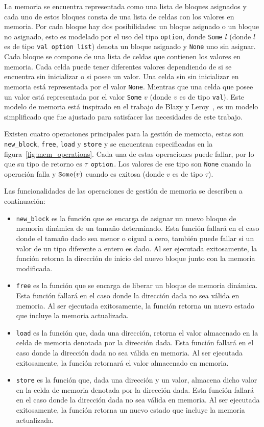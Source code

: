 La memoria se encuentra representada como una lista de bloques asignados y cada uno de estos bloques consta de una lista de celdas con los valores en memoria.
Por cada bloque hay dos posibilidades: un bloque asignado o un bloque no asignado, esto es modelado por el uso del tipo \verb|option|, donde \verb|Some| $l$ (donde $l$ es de tipo \verb|val option list|) denota un bloque asignado y \verb|None| uno sin asignar.
Cada bloque se compone de una lista de celdas que contienen los valores en memoria.
Cada celda puede tener diferentes valores dependiendo de si se encuentra sin inicializar o si posee un valor.
Una celda sin sin inicializar en memoria está representada por el valor \verb|None|.
Mientras que una celda que posee un valor está representada por el valor \verb|Some| $v$ (donde $v$ es de tipo \verb|val|).
Este modelo de memoria está inspirado en el trabajo de Blazy y Leroy~\cite{leroy-blazy-memory-model}, es un modelo simplificado que fue ajustado para satisfacer las necesidades de este trabajo.

Existen cuatro operaciones principales para la gestión de memoria, estas son \verb|new_block|, \verb|free|, \verb|load| y \verb|store| y se encuentran especificadas en la figura~\ref{fig:mem_operations}.
Cada una de estas operaciones puede fallar, por lo que su tipo de retorno es $\tau\ \verb|option|$.
Los valores de ese tipo son \verb|None| cuando la operación falla y $\verb|Some|(v)$ cuando es exitosa (donde $v$ es de tipo $\tau$).

Las funcionalidades de las operaciones de gestión de memoria se describen a continuación:

\begin{itemize}
  \item{\verb|new_block| es la función que se encarga de asignar un nuevo bloque de memoria dinámica de un tamaño determinado.
    Esta función fallará en el caso donde el tamaño dado sea menor o oigual a cero, también puede fallar si un valor de un tipo diferente a entero es dado.
    Al ser ejecutada exitosamente, la función retorna la dirección de inicio del nuevo bloque junto con la memoria modificada.}
  \item{\verb|free| es la función que se encarga de liberar un bloque de memoria dinámica.
    Esta función fallará en el caso donde la dirección dada no sea válida en memoria.
    Al ser ejecutada exitosamente, la función retorna un nuevo estado que incluye la memoria actualizada.}
  \item{\verb|load| es la función que, dada una dirección, retorna el valor almacenado en la celda de memoria denotada por la dirección dada.
    Esta función fallará en el caso donde la dirección dada no sea válida en memoria.
    Al ser ejecutada exitosamente, la función retornará el valor almacenado en memoria.}
  \item{\verb|store| es la función que, dada una dirección y un valor, almacena dicho valor en la celda de memoria denotada por la dirección dada.
    Esta función fallará en el caso donde la dirección dada no sea válida en memoria.
    Al ser ejecutada exitosamente, la función retorna un nuevo estado que incluye la memoria actualizada.}
\end{itemize}

